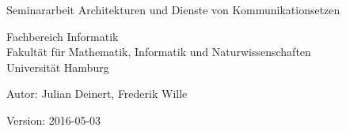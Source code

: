 \documentclass[
    paper=A4,pagesize,  %
    ngerman,            %
    oneside,            %
    parskip=full*       %
]{scrartcl}
\begin{document}
\begin{titlepage}
    \vspace{75pt}
    \textbf{\Huge \metaTitle}

    \vspace{20pt}

    {\Large Seminararbeit Architekturen und Dienste von Kommunikationsetzen}


    \vspace{5pt}

    Fachbereich Informatik\\
    Fakultät für Mathematik, Informatik und Naturwissenschaften\\
    Universität Hamburg

    \vfill


    \vfill
    \Large
    Autor: Julian Deinert, Frederik Wille

    Version: 2016-05-03
    \vspace{75pt}
\end{titlepage}

\tableofcontents





\clearpage
\printbibliography
\end{document}

